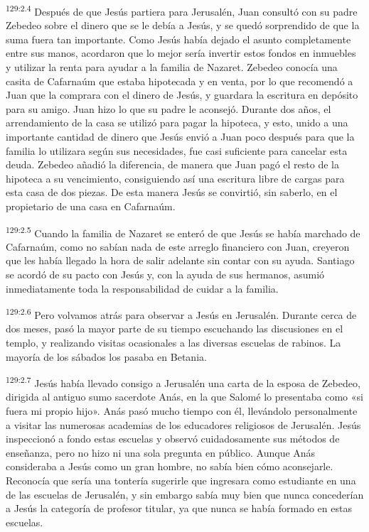 \par 
\textsuperscript{129:2.4} Después de que Jesús partiera para Jerusalén, Juan consultó con su padre Zebedeo sobre el dinero que se le debía a Jesús, y se quedó sorprendido de que la suma fuera tan importante. Como Jesús había dejado el asunto completamente entre sus manos, acordaron que lo mejor sería invertir estos fondos en inmuebles y utilizar la renta para ayudar a la familia de Nazaret. Zebedeo conocía una casita de Cafarnaúm que estaba hipotecada y en venta, por lo que recomendó a Juan que la comprara con el dinero de Jesús, y guardara la escritura en depósito para su amigo. Juan hizo lo que su padre le aconsejó. Durante dos años, el arrendamiento de la casa se utilizó para pagar la hipoteca, y esto, unido a una importante cantidad de dinero que Jesús envió a Juan poco después para que la familia lo utilizara según sus necesidades, fue casi suficiente para cancelar esta deuda. Zebedeo añadió la diferencia, de manera que Juan pagó el resto de la hipoteca a su vencimiento, consiguiendo así una escritura libre de cargas para esta casa de dos piezas. De esta manera Jesús se convirtió, sin saberlo, en el propietario de una casa en Cafarnaúm.

\par 
\textsuperscript{129:2.5} Cuando la familia de Nazaret se enteró de que Jesús se había marchado de Cafarnaúm, como no sabían nada de este arreglo financiero con Juan, creyeron que les había llegado la hora de salir adelante sin contar con su ayuda. Santiago se acordó de su pacto con Jesús y, con la ayuda de sus hermanos, asumió inmediatamente toda la responsabilidad de cuidar a la familia.

\par 
\textsuperscript{129:2.6} Pero volvamos atrás para observar a Jesús en Jerusalén. Durante cerca de dos meses, pasó la mayor parte de su tiempo escuchando las discusiones en el templo, y realizando visitas ocasionales a las diversas escuelas de rabinos. La mayoría de los sábados los pasaba en Betania.

\par 
\textsuperscript{129:2.7} Jesús había llevado consigo a Jerusalén una carta de la esposa de Zebedeo, dirigida al antiguo sumo sacerdote Anás, en la que Salomé lo presentaba como «si fuera mi propio hijo». Anás pasó mucho tiempo con él, llevándolo personalmente a visitar las numerosas academias de los educadores religiosos de Jerusalén. Jesús inspeccionó a fondo estas escuelas y observó cuidadosamente sus métodos de enseñanza, pero no hizo ni una sola pregunta en público. Aunque Anás consideraba a Jesús como un gran hombre, no sabía bien cómo aconsejarle. Reconocía que sería una tontería sugerirle que ingresara como estudiante en una de las escuelas de Jerusalén, y sin embargo sabía muy bien que nunca concederían a Jesús la categoría de profesor titular, ya que nunca se había formado en estas escuelas.

